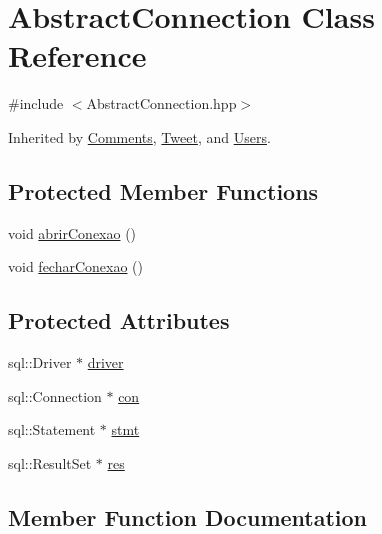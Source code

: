 \hypertarget{class_abstract_connection}{}\section{Abstract\+Connection Class Reference}
\label{class_abstract_connection}


{\ttfamily \#include $<$Abstract\+Connection.\+hpp$>$}



Inherited by \hyperlink{class_comments}{Comments}, \hyperlink{class_tweet}{Tweet}, and \hyperlink{class_users}{Users}.

\subsection*{Protected Member Functions}
\begin{DoxyCompactItemize}
\item 
void \hyperlink{class_abstract_connection_a50c02bea35ad403f700e4d43cc612499}{abrir\+Conexao} ()
\item 
void \hyperlink{class_abstract_connection_a6cd2b874f6d05c6ebc897639bf41f3d5}{fechar\+Conexao} ()
\end{DoxyCompactItemize}
\subsection*{Protected Attributes}
\begin{DoxyCompactItemize}
\item 
sql\+::\+Driver $\ast$ \hyperlink{class_abstract_connection_a0e87a29455298654e482aad8276886b3}{driver}
\item 
sql\+::\+Connection $\ast$ \hyperlink{class_abstract_connection_a6258f0f87cb400fe806fce5932663e95}{con}
\item 
sql\+::\+Statement $\ast$ \hyperlink{class_abstract_connection_a1ef8a1192a35a535ba523a015c0890ec}{stmt}
\item 
sql\+::\+Result\+Set $\ast$ \hyperlink{class_abstract_connection_a4dd12c03bfa5f7d03a231c32c2e01a90}{res}
\end{DoxyCompactItemize}


\subsection{Member Function Documentation}
\mbox{\label{class_abstract_connection_a50c02bea35ad403f700e4d43cc612499}} 
